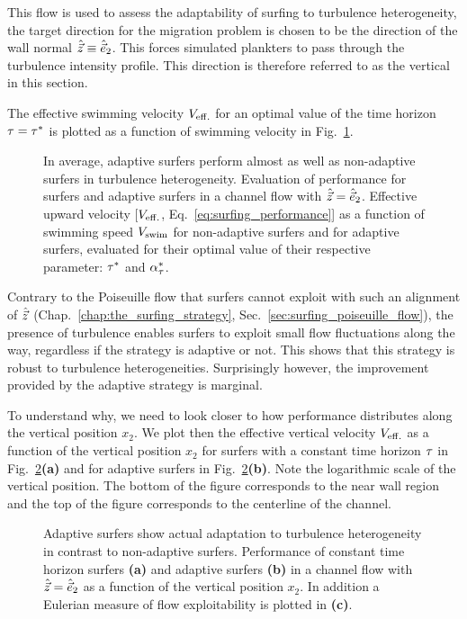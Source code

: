 This flow is used to assess the adaptability of surfing to turbulence heterogeneity, the target direction for the migration problem is chosen to be the direction of the wall normal $\hat{\vec{z}} \equiv \hat{\vec{e}}_2$.
This forces simulated plankters to pass through the turbulence intensity profile.
This direction is therefore referred to as the vertical in this section.

The effective swimming velocity $V_{\mathrm{eff.}}$ for an optimal value of the time horizon $\tau = \tau^*$ is plotted as a function of swimming velocity in Fig.~\ref{fig:channel_perf_y}.
\begin{figure}
	\centering
	
	\caption[In average, adaptive surfers perform almost as well as non-adaptive surfers in turbulence heterogeneity.]{
		In average, adaptive surfers perform almost as well as non-adaptive surfers in turbulence heterogeneity.
		Evaluation of performance for surfers and adaptive surfers in a channel flow with $\hat{\vec{z}} = \hat{\vec{e}}_2$.
		Effective upward velocity [$V_{\mathrm{eff.}}$, Eq.~\eqref{eq:surfing_performance}] as a function of swimming speed $V_{\mathrm{swim}}$ for non-adaptive surfers and for adaptive surfers, evaluated for their optimal value of their respective parameter: $\tau^*$ and  $\alpha_{\tau}^*$.
	}
	\label{fig:channel_perf_y}
\end{figure}
Contrary to the Poiseuille flow that surfers cannot exploit with such an alignment of $\hat{\vec{z}}$ (Chap.~\ref{chap:the_surfing_strategy}, Sec.~\ref{sec:surfing_poiseuille_flow}), the presence of turbulence enables surfers to exploit small flow fluctuations along the way, regardless if the strategy is adaptive or not.
This shows that this strategy is robust to turbulence heterogeneities.
Surprisingly however, the improvement provided by the adaptive strategy is marginal.

To understand why, we need to look closer to how performance distributes along the vertical position $x_2$.
We plot then the effective vertical velocity $V_{\mathrm{eff.}}$ as a function of the vertical position $x_2$ for surfers with a constant time horizon $\tau$ in Fig.~\ref{fig:channel_binned_velocity_y}\textbf{(a)} and for adaptive surfers in Fig.~\ref{fig:channel_binned_velocity_y}\textbf{(b)}.
Note the logarithmic scale of the vertical position.
The bottom of the figure corresponds to the near wall region and the top of the figure corresponds to the centerline of the channel.
\begin{figure}
	\centering
	
	\caption[Adaptive surfers show actual adaptation to turbulence heterogeneity in contrast to non-adaptive surfers.]{
		Adaptive surfers show actual adaptation to turbulence heterogeneity in contrast to non-adaptive surfers.
		Performance of constant time horizon surfers \textbf{(a)} and adaptive surfers \textbf{(b)} in a channel flow with $\hat{\vec{z}} = \hat{\vec{e}}_2$ as a function of the vertical position $x_2$. 
		In addition a Eulerian measure of flow exploitability is plotted in \textbf{(c)}.
	}
	\label{fig:channel_binned_velocity_y}
\end{figure}

